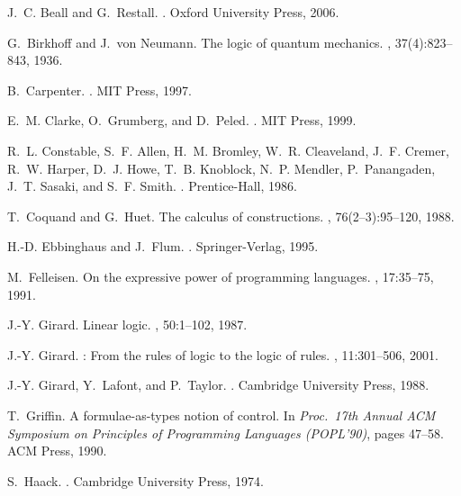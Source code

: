\documentclass[11pt]{article}
\newcommand{\<}{\langle}
\renewcommand{\>}{\rangle}
\begin{document}
\begin{thebibliography}{10}

J.~C. Beall and G.~Restall.
.
\newblock Oxford University Press, 2006.

G.~Birkhoff and J.~von Neumann.
\newblock The logic of quantum mechanics.
, 37(4):823--843, 1936.

B.~Carpenter.
.
\newblock MIT Press, 1997.

E.~M. Clarke, O.~Grumberg, and D.~Peled.
.
\newblock MIT Press, 1999.

R.~L. Constable, S.~F. Allen, H.~M. Bromley, W.~R. Cleaveland, J.~F. Cremer,
  R.~W. Harper, D.~J. Howe, T.~B. Knoblock, N.~P. Mendler, P.~Panangaden, J.~T.
  Sasaki, and S.~F. Smith.
.
\newblock Prentice-Hall, 1986.

T.~Coquand and G.~Huet.
\newblock The calculus of constructions.
, 76(2--3):95--120, 1988.

H.-D. Ebbinghaus and J.~Flum.
.
\newblock Springer-Verlag, 1995.

M.~Felleisen.
\newblock On the expressive power of programming languages.
, 17:35--75, 1991.

J.-Y. Girard.
\newblock Linear logic.
, 50:1--102, 1987.

J.-Y. Girard.
: From the rules of logic to the logic of rules.
, 11:301--506, 2001.

J.-Y. Girard, Y.~Lafont, and P.~Taylor.
.
\newblock Cambridge University Press, 1988.

T.~Griffin.
\newblock A formulae-as-types notion of control.
\newblock In {\em Proc.~17th Annual ACM Symposium on Principles of Programming
  Languages (POPL'90)}, pages 47--58. ACM Press, 1990.

S.~Haack.
.
\newblock Cambridge University Press, 1974.


\end{thebibliography}
\end{document}

